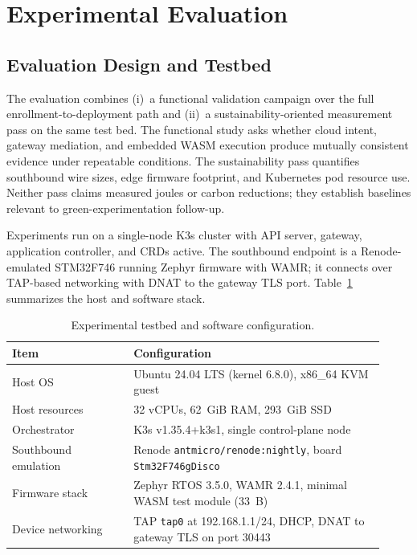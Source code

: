 \section{Experimental Evaluation}\label{sec:evaluation}

\subsection{Evaluation Design and Testbed}
The evaluation combines (i)~a functional validation campaign over the full enrollment-to-deployment path and (ii)~a sustainability-oriented measurement pass on the same test bed. The functional study asks whether cloud intent, gateway mediation, and embedded WASM execution produce mutually consistent evidence under repeatable conditions. The sustainability pass quantifies southbound wire sizes, edge firmware footprint, and Kubernetes pod resource use. Neither pass claims measured joules or carbon reductions; they establish baselines relevant to green-experimentation follow-up.

Experiments run on a single-node K3s cluster with API server, gateway, application controller, and CRDs active. The southbound endpoint is a Renode-emulated STM32F746 running Zephyr firmware with WAMR; it connects over TAP-based networking with DNAT to the gateway TLS port. Table~\ref{tab:testbed} summarizes the host and software stack.

\begin{table}[t]
\centering
\caption{Experimental testbed and software configuration.}
\label{tab:testbed}
\footnotesize
\setlength{\tabcolsep}{3pt}
\begin{tabular}{p{0.30\linewidth} p{0.62\linewidth}}
\toprule
\textbf{Item} & \textbf{Configuration} \\
\midrule
Host OS & Ubuntu 24.04 LTS (kernel 6.8.0), x86\_64 KVM guest \\
Host resources & 32 vCPUs, 62~GiB RAM, 293~GiB SSD \\
Orchestrator & K3s v1.35.4+k3s1, single control-plane node \\
Southbound emulation & Renode \texttt{antmicro/renode:nightly}, board \texttt{Stm32F746gDisco} \\
Firmware stack & Zephyr RTOS 3.5.0, WAMR 2.4.1, minimal WASM test module (33~B) \\
Device networking & TAP \texttt{tap0} at 192.168.1.1/24, DHCP, DNAT to gateway TLS on port 30443 \\
\bottomrule
\end{tabular}
\end{table}

